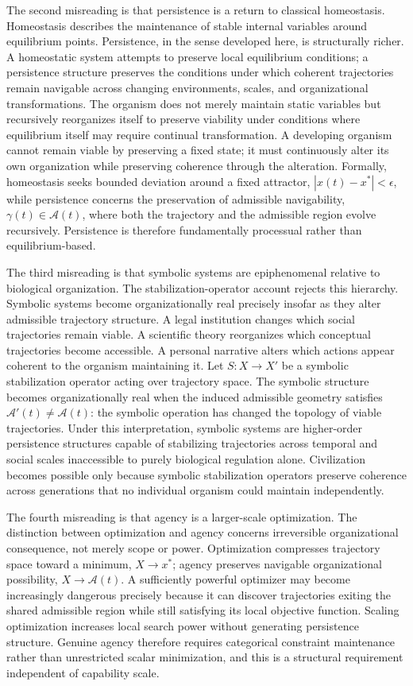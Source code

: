\documentclass[12pt,a4paper]{report}
\theoremstyle{flyxion}
\begin{document}
The second misreading is that persistence is a return to classical homeostasis. Homeostasis describes the maintenance of stable internal variables around equilibrium points. Persistence, in the sense developed here, is structurally richer. A homeostatic system attempts to preserve local equilibrium conditions; a persistence structure preserves the conditions under which coherent trajectories remain navigable across changing environments, scales, and organizational transformations. The organism does not merely maintain static variables but recursively reorganizes itself to preserve viability under conditions where equilibrium itself may require continual transformation. A developing organism cannot remain viable by preserving a fixed state; it must continuously alter its own organization while preserving coherence through the alteration. Formally, homeostasis seeks bounded deviation around a fixed attractor, $|x(t) - x^\ast| < \epsilon$, while persistence concerns the preservation of admissible navigability, $\gamma(t) \in \mathcal{A}(t)$, where both the trajectory and the admissible region evolve recursively. Persistence is therefore fundamentally processual rather than equilibrium-based.

The third misreading is that symbolic systems are epiphenomenal relative to biological organization. The stabilization-operator account rejects this hierarchy. Symbolic systems become organizationally real precisely insofar as they alter admissible trajectory structure. A legal institution changes which social trajectories remain viable. A scientific theory reorganizes which conceptual trajectories become accessible. A personal narrative alters which actions appear coherent to the organism maintaining it. Let $S : X \rightarrow X'$ be a symbolic stabilization operator acting over trajectory space. The symbolic structure becomes organizationally real when the induced admissible geometry satisfies $\mathcal{A}'(t) \neq \mathcal{A}(t)$: the symbolic operation has changed the topology of viable trajectories. Under this interpretation, symbolic systems are higher-order persistence structures capable of stabilizing trajectories across temporal and social scales inaccessible to purely biological regulation alone. Civilization becomes possible only because symbolic stabilization operators preserve coherence across generations that no individual organism could maintain independently.

The fourth misreading is that agency is a larger-scale optimization. The distinction between optimization and agency concerns irreversible organizational consequence, not merely scope or power. Optimization compresses trajectory space toward a minimum, $X \rightarrow x^\ast$; agency preserves navigable organizational possibility, $X \rightarrow \mathcal{A}(t)$. A sufficiently powerful optimizer may become increasingly dangerous precisely because it can discover trajectories exiting the shared admissible region while still satisfying its local objective function. Scaling optimization increases local search power without generating persistence structure. Genuine agency therefore requires categorical constraint maintenance rather than unrestricted scalar minimization, and this is a structural requirement independent of capability scale.
\end{document}
